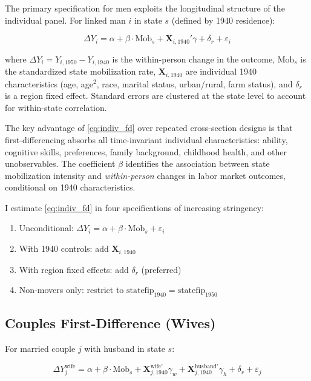 \documentclass[12pt]{article}
\begin{document}
The primary specification for men exploits the longitudinal structure of the individual panel. For linked man $i$ in state $s$ (defined by 1940 residence):

\begin{equation}
\Delta Y_i = \alpha + \beta \cdot \text{Mob}_s + \mathbf{X}_{i,1940}' \gamma + \delta_r + \varepsilon_i
\label{eq:indiv_fd}
\end{equation}

\noindent where $\Delta Y_i = Y_{i,1950} - Y_{i,1940}$ is the within-person change in the outcome, $\text{Mob}_s$ is the standardized state mobilization rate, $\mathbf{X}_{i,1940}$ are individual 1940 characteristics (age, age$^2$, race, marital status, urban/rural, farm status), and $\delta_r$ is a region fixed effect. Standard errors are clustered at the state level to account for within-state correlation.

The key advantage of \cref{eq:indiv_fd} over repeated cross-section designs is that first-differencing absorbs all time-invariant individual characteristics: ability, cognitive skills, preferences, family background, childhood health, and other unobservables. The coefficient $\beta$ identifies the association between state mobilization intensity and \textit{within-person} changes in labor market outcomes, conditional on 1940 characteristics.

I estimate \cref{eq:indiv_fd} in four specifications of increasing stringency:

\begin{enumerate}
\item[M1.] Unconditional: $\Delta Y_i = \alpha + \beta \cdot \text{Mob}_s + \varepsilon_i$
\item[M2.] With 1940 controls: add $\mathbf{X}_{i,1940}$
\item[M3.] With region fixed effects: add $\delta_r$ (preferred)
\item[M4.] Non-movers only: restrict to $\text{statefip}_{1940} = \text{statefip}_{1950}$
\end{enumerate}

\subsection{Couples First-Difference (Wives)}

For married couple $j$ with husband in state $s$:

\begin{equation}
\Delta Y_j^{\text{wife}} = \alpha + \beta \cdot \text{Mob}_s + \mathbf{X}_{j,1940}^{\text{wife}'} \gamma_w + \mathbf{X}_{j,1940}^{\text{husband}'} \gamma_h + \delta_r + \varepsilon_j
\label{eq:couples_fd}
\end{equation}
\end{document}
